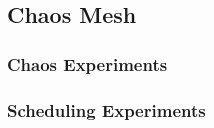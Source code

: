 \subsection{Chaos Mesh} \label{background-chaos-mesh}

\subsubsection{Chaos Experiments}

\subsubsection{Scheduling Experiments}



